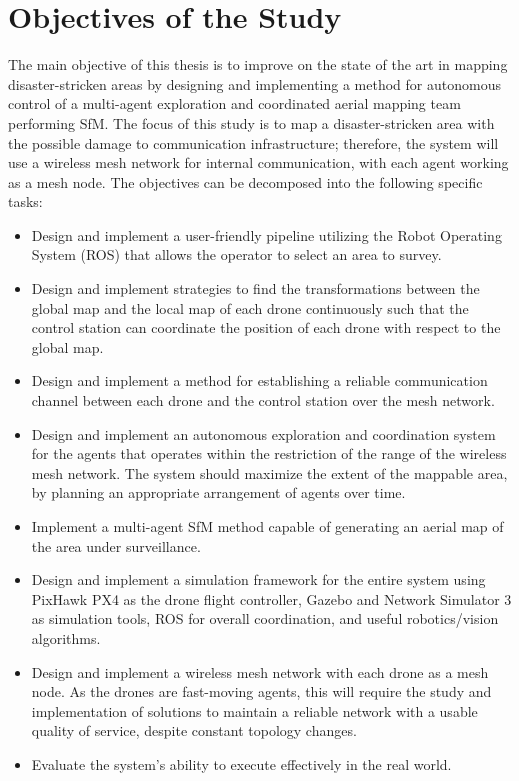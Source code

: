 \section{Objectives of the Study}

The main objective of this thesis is to improve on the state of the art in mapping disaster-stricken areas by designing and implementing a method for autonomous control of a multi-agent exploration and coordinated aerial mapping team performing SfM. The focus of this study is to map a disaster-stricken area with the possible damage to communication infrastructure; therefore, the system will use a wireless mesh network for internal communication, with each agent working as a mesh node. The objectives can be decomposed into the following specific tasks:
\begin{itemize}
	\item Design and implement a user-friendly pipeline utilizing the Robot Operating System (ROS) that allows the operator to select an area to survey.
	
	\item Design and implement strategies to find the transformations between the global map and the local map of each drone continuously such that the control station can coordinate the position of each drone with respect to the global map.
	
	\item Design and implement a method for establishing a reliable communication channel between each drone and the control station over the mesh network.
	
	\item Design and implement an autonomous exploration and coordination system for the agents that operates within the restriction of the range of the wireless mesh network. The system should maximize the extent of the mappable area, by planning an appropriate arrangement of agents over time.
	
	\item Implement a multi-agent SfM method capable of generating an aerial map of the area under surveillance.
	
	\item Design and implement a simulation framework for the entire system using PixHawk PX4 as the drone flight controller, Gazebo and Network Simulator 3 as simulation tools, ROS for overall coordination, and useful robotics/vision algorithms.
	
	\item Design and implement a wireless mesh network with each drone as a mesh node. As the drones are fast-moving agents, this will require the study and implementation of solutions to maintain a reliable network with a usable quality of service, despite constant topology changes.
	
	\item Evaluate the system's ability to execute effectively in the real world.
\end{itemize}

